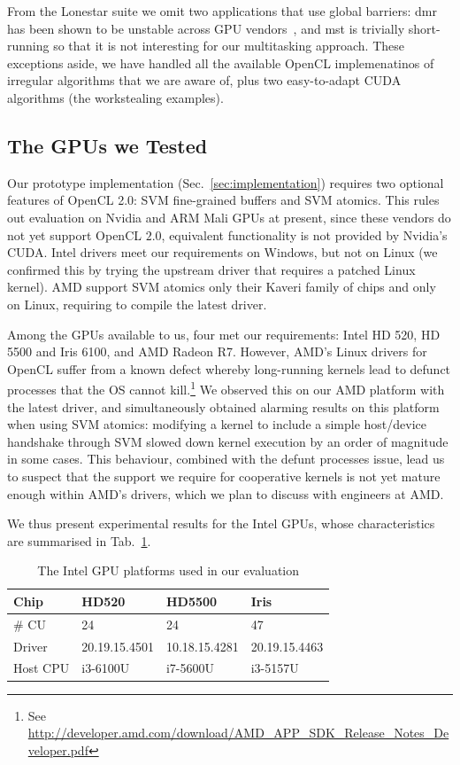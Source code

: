 \documentclass[numbers,nocopyrightspace,10pt]{sigplanconf}
\newcommand{\mytab}{Tab.~}
\newcommand{\mysec}{Sec.~}
\newcommand{\nvidia}{Nvidia\xspace}
\begin{document}
From the Lonestar suite we omit two applications that use global barriers:
dmr has been shown to be unstable across GPU vendors~\cite{DBLP:conf/iwocl/SorensenD16}, and mst is trivially short-running so that it is not
interesting for our multitasking approach.
%
These exceptions aside, we have handled all the available OpenCL
implemenatinos of irregular algorithms that we are aware of, plus two
easy-to-adapt CUDA algorithms (the workstealing examples).



\subsection{The GPUs we Tested}\label{sec:gpus}

Our prototype implementation (\mysec\ref{sec:implementation}) requires
two optional features of OpenCL 2.0: SVM fine-grained buffers and SVM
atomics. This rules out evaluation on \nvidia and ARM Mali GPUs at
present, since these vendors do not yet support OpenCL $2.0$,
equivalent functionality is not provided by \nvidia's CUDA. Intel
drivers meet our requirements on Windows, but not on Linux (we
confirmed this by trying the upstream driver that requires a patched
Linux kernel). AMD support SVM atomics only their Kaveri family of
chips and only on Linux, requiring to compile the latest driver.

Among the GPUs available to us, four met our
requirements: Intel HD 520, HD 5500 and Iris 6100, and AMD Radeon R7.
However, AMD's Linux drivers for OpenCL suffer from a known defect
whereby long-running kernels lead to defunct processes that the OS
cannot kill.\footnote{See \url{http://developer.amd.com/download/AMD_APP_SDK_Release_Notes_Developer.pdf}}  We observed this on our AMD platform with the latest
driver, and simultaneously obtained alarming results on this platform
when using SVM atomics: modifying a kernel to include a simple
host/device handshake through SVM slowed down kernel execution by an
order of magnitude in some cases.  This behaviour, combined with the
defunt processes issue, lead us to suspect that the support we require
for cooperative kernels is not yet mature enough within AMD's drivers,
which we plan to discuss with engineers at AMD.

We thus present experimental results for the Intel GPUs, whose characteristics are summarised in \mytab\ref{tab:chipstested}.

\begin{table}
\footnotesize
\centering
\begin{tabular}{ l l l l }
Chip & HD520 & HD5500 & Iris\\
\hline
\# CU  & 24 & 24 & 47 \\
Driver   & 20.19.15.4501 & 10.18.15.4281 & 20.19.15.4463 \\
Host CPU & i3-6100U & i7-5600U & i3-5157U \\
\end{tabular}
\caption{The Intel GPU platforms used in our evaluation}
\label{tab:chipstested}
\end{table}
\end{document}
